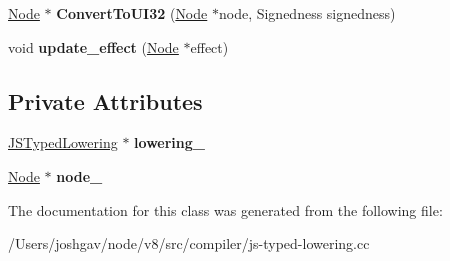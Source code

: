 \begin{DoxyCompactItemize}
\item 
\hyperlink{classv8_1_1internal_1_1compiler_1_1_node}{Node} $\ast$ {\bfseries Convert\+To\+U\+I32} (\hyperlink{classv8_1_1internal_1_1compiler_1_1_node}{Node} $\ast$node, Signedness signedness)\hypertarget{classv8_1_1internal_1_1compiler_1_1_j_s_binop_reduction_a4cf6f68ae8646ee9086ff49c74f9ba3c}{}\label{classv8_1_1internal_1_1compiler_1_1_j_s_binop_reduction_a4cf6f68ae8646ee9086ff49c74f9ba3c}

\item 
void {\bfseries update\+\_\+effect} (\hyperlink{classv8_1_1internal_1_1compiler_1_1_node}{Node} $\ast$effect)\hypertarget{classv8_1_1internal_1_1compiler_1_1_j_s_binop_reduction_a61e0e8954a1c6852f02f3f0938069c62}{}\label{classv8_1_1internal_1_1compiler_1_1_j_s_binop_reduction_a61e0e8954a1c6852f02f3f0938069c62}

\end{DoxyCompactItemize}
\subsection*{Private Attributes}
\begin{DoxyCompactItemize}
\item 
\hyperlink{classv8_1_1internal_1_1compiler_1_1_j_s_typed_lowering}{J\+S\+Typed\+Lowering} $\ast$ {\bfseries lowering\+\_\+}\hypertarget{classv8_1_1internal_1_1compiler_1_1_j_s_binop_reduction_a2df0eec534a503341d0852ed1f9326fd}{}\label{classv8_1_1internal_1_1compiler_1_1_j_s_binop_reduction_a2df0eec534a503341d0852ed1f9326fd}

\item 
\hyperlink{classv8_1_1internal_1_1compiler_1_1_node}{Node} $\ast$ {\bfseries node\+\_\+}\hypertarget{classv8_1_1internal_1_1compiler_1_1_j_s_binop_reduction_a0b3a374fe53e629c0643c8776f59343b}{}\label{classv8_1_1internal_1_1compiler_1_1_j_s_binop_reduction_a0b3a374fe53e629c0643c8776f59343b}

\end{DoxyCompactItemize}


The documentation for this class was generated from the following file\+:\begin{DoxyCompactItemize}
\item 
/\+Users/joshgav/node/v8/src/compiler/js-\/typed-\/lowering.\+cc\end{DoxyCompactItemize}
